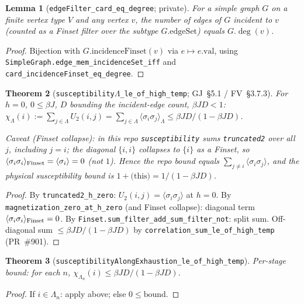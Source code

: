 \documentclass[a4paper,11pt]{article}
\newtheorem{theorem}{Theorem}
\newtheorem{lemma}[theorem]{Lemma}
\newcommand{\LeanLambda}{\texorpdfstring{\ensuremath{\Lambda}}{Lambda}}
\begin{document}
\begin{lemma}[\texttt{edgeFilter\_card\_eq\_degree}; private]
  For a simple graph $G$ on a finite vertex type $V$ and any vertex $v$,
  the number of edges of $G$ incident to $v$ (counted as a Finset filter over
  the subtype $G.\mathrm{edgeSet}$) equals $G.\deg(v)$.
\end{lemma}
\begin{proof}
  Bijection with $G.\mathrm{incidenceFinset}(v)$ via $e \mapsto e.\mathrm{val}$,
  using \texttt{SimpleGraph.edge\_mem\_incidenceSet\_iff}
  and \texttt{card\_incidenceFinset\_eq\_degree}.
\end{proof}

\begin{theorem}[\texttt{susceptibility\LeanLambda\_le\_of\_high\_temp}; GJ~\S5.1 / FV~\S3.7.3]
  For $h=0$, $0\le\beta J$, $D$ bounding the incident-edge count, $\beta J D<1$:
  $\chi_\Lambda(i)
  := \sum_{j\in\Lambda} U_2(i,j)
  = \sum_{j\in\Lambda}\langle\sigma_i\sigma_j\rangle_\Lambda
  \le \beta J D/(1-\beta J D)$.

  \emph{Caveat (Finset collapse)}: in this repo \texttt{susceptibility} sums
  \texttt{truncated2} over \emph{all} $j$, including $j=i$;
  the diagonal $\{i,i\}$ collapses to $\{i\}$ as a Finset, so
  $\langle\sigma_i\sigma_i\rangle_{\rm Finset} = \langle\sigma_i\rangle = 0$ (not $1$).
  Hence the repo bound equals $\sum_{j\ne i}\langle\sigma_i\sigma_j\rangle$,
  and the physical susceptibility bound is $1+\text{(this)} = 1/(1-\beta J D)$.
\end{theorem}
\begin{proof}
  By \texttt{truncated2\_h\_zero}: $U_2(i,j)=\langle\sigma_i\sigma_j\rangle$ at $h=0$.
  By \texttt{magnetization\_zero\_at\_h\_zero} (and Finset collapse):
  diagonal term $\langle\sigma_i\sigma_i\rangle_{\rm Finset}=0$.
  By \texttt{Finset.sum\_filter\_add\_sum\_filter\_not}: split sum.
  Off-diagonal sum $\le \beta J D/(1-\beta J D)$ by
  \texttt{correlation\_sum\_le\_of\_high\_temp} (PR~\#901).
\end{proof}

\begin{theorem}[\texttt{susceptibilityAlongExhaustion\_le\_of\_high\_temp}]
  Per-stage bound: for each $n$,
  $\chi_{\Lambda_n}(i) \le \beta J D/(1-\beta J D)$.
\end{theorem}
\begin{proof}
  If $i\in\Lambda_n$: apply above; else $0 \le \text{bound}$.
\end{proof}
\end{document}
